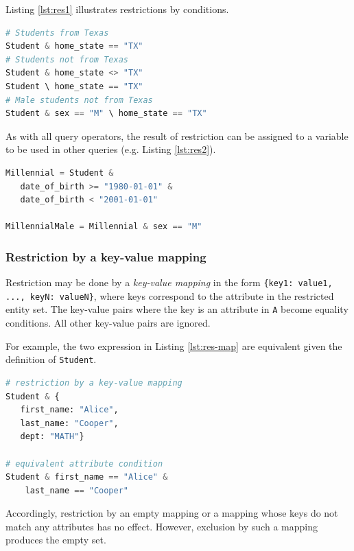 \documentclass[letter,10pt]{article}
\begin{document}
Listing \ref{lst:res1} illustrates restrictions by conditions.
\begin{lstlisting}[language=Python, caption={Restrictions by attribute conditions.}, label={lst:res1}]
# Students from Texas
Student & home_state == "TX"
# Students not from Texas
Student & home_state <> "TX"
Student \ home_state == "TX"
# Male students not from Texas
Student & sex == "M" \ home_state == "TX"
\end{lstlisting}

As with all query operators, the result of restriction can be assigned to a variable to be used in other queries (e.g. Listing \ref{lst:res2}).
\begin{lstlisting}[language=Python, caption={Assignment and use of relational variables.}, label={lst:res2}]
Millennial = Student & 
   date_of_birth >= "1980-01-01" & 
   date_of_birth < "2001-01-01"

MillennialMale = Millennial & sex == "M"
\end{lstlisting}

\subsubsection{Restriction by a key-value mapping}
Restriction may be done by a \emph{key-value mapping} in the form \lstinline${key1: value1, ..., keyN: valueN}$, where 
keys correspond to the attribute in the restricted entity set.  
The key-value pairs where the key is an attribute in \lstinline$A$ become equality conditions. 
All other key-value pairs are ignored.  

For example, the two expression in Listing \ref{lst:res-map} are equivalent given the definition of \lstinline$Student$.
\begin{lstlisting}[language=Python, caption={Equivalent expressions using restrictions by a mapping and by attribute conditions.  The condition on \lstinline$dept$ is ignored because it is not an attribute in \lstinline$Student$.}, label={lst:res-map}]
# restriction by a key-value mapping
Student & {
   first_name: "Alice", 
   last_name: "Cooper", 
   dept: "MATH"}

# equivalent attribute condition 
Student & first_name == "Alice" & 
    last_name == "Cooper"
\end{lstlisting}

Accordingly, restriction by an empty mapping or a mapping whose keys do not match any attributes has no effect.  
However, exclusion by such a mapping produces the empty set.
\end{document}
